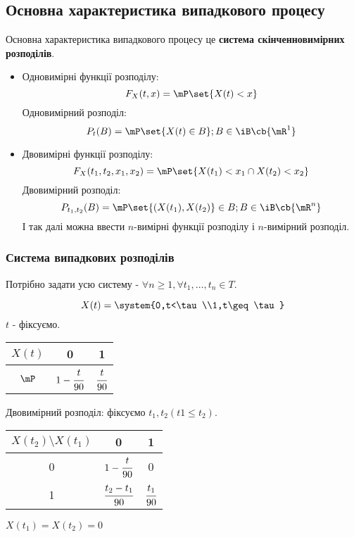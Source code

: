 \subsection{Основна характеристика випадкового процесу}
Основна характеристика випадкового процесу це \textbf{система скінченновимірних розподілів}.
\begin{itemize}
\item Одновимірні функції розподілу:\\
\begin{equation}
F_X(t,x) = \mP\set{X(t)<x}
\end{equation}
Одновимірний розподіл:
\begin{equation}
P_t(B) = \mP\set{X(t)\in B};B\in\iB\cb{\mR^1}
\end{equation}
\item Двовимірні функції розподілу:\\
\begin{equation}
F_X(t_1,t_2,x_1,x_2) = \mP\set{X(t_1)< x_1 \cap X(t_2) < x_2}
\end{equation}
Двовимірний розподіл:
\begin{equation}
P_{t_1,t_2} (B) = \mP\set{(X(t_1),X(t_2)}\in B;B\in\iB\cb{\mR^n}
\end{equation}
І так далі можна ввести $n$-вимірні функції розподілу і $n$-вимірний розподіл.
\end{itemize}
\subsubsection{Система випадкових розподілів}
Потрібно задати усю систему - $\forall n\geq 1,\forall t_1,\ldots,t_n \in T$.
\begin{exs}
\begin{equation*}
X(t) = \system{0,t<\tau\\1,t\geq \tau}
\end{equation*}
$t$ - фіксуємо.\\
\begin{center}
\begin{tabular}{|c|c|c|}
$X(t)$ & 0 & 1 \\
\hline
$\mP$ & $1-\cfrac t{90}$ & $\cfrac t{90}$
\end{tabular}
\end{center}
Двовимірний розподіл: фіксуємо $t_1,t_2(t1\leq t_2)$.\\
\begin{center}
\begin{tabular}{|c|c|c|}
$X(t_2)\setminus X(t_1)$ & 0 & 1 \\
\hline
0 & $1 - \cfrac t{90}$ & 0 \\
\hline
1 & $\cfrac{t_2-t_1}{90}$ & $\cfrac{t_1}{90}$
\end{tabular}
\end{center}
$X(t_1) = X(t_2) =0$\\
\end{exs}
